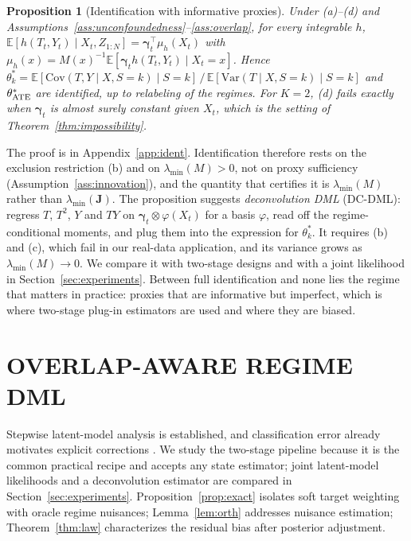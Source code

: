 \documentclass[twoside]{article}
\newtheorem{proposition}{Proposition}
\theoremstyle{definition}
\newcommand{\E}{\mathbb{E}}
\newcommand{\Var}{\mathrm{Var}}
\newcommand{\Cov}{\mathrm{Cov}}
\newcommand{\bJ}{\boldsymbol{J}}
\newcommand{\bgam}{\boldsymbol{\gamma}}
\newcommand{\lmin}{\lambda_{\min}}
\begin{document}
\begin{proposition}[Identification with informative proxies]
\label{prop:ident}
Under (a)--(d) and Assumptions~\ref{ass:unconfoundedness}--\ref{ass:overlap}, for every integrable $h$, $\E[h(T_t,Y_t)\mid X_t,Z_{1:N}]=\bgam_t^\top\mu_h(X_t)$ with $\mu_h(x)=M(x)^{-1}\E[\bgam_th(T_t,Y_t)\mid X_t{=}x]$. Hence $\theta_k^*=\E[\Cov(T,Y\mid X,S{=}k)\mid S{=}k]\,/\,\E[\Var(T\mid X,S{=}k)\mid S{=}k]$ and $\theta^*_{\rm ATE}$ are identified, up to relabeling of the regimes. For $K=2$, (d) fails exactly when $\bgam_t$ is almost surely constant given $X_t$, which is the setting of Theorem~\ref{thm:impossibility}.
\end{proposition}
The proof is in Appendix~\ref{app:ident}. Identification therefore rests on the exclusion restriction (b) and on $\lmin(M)>0$, not on proxy sufficiency (Assumption~\ref{ass:innovation}), and the quantity that certifies it is $\lmin(M)$ rather than $\lmin(\bJ)$. The proposition suggests \emph{deconvolution DML} (DC-DML): regress $T$, $T^2$, $Y$ and $TY$ on $\bgam_t\otimes\varphi(X_t)$ for a basis $\varphi$, read off the regime-conditional moments, and plug them into the expression for $\theta_k^*$. It requires (b) and (c), which fail in our real-data application, and its variance grows as $\lmin(M)\to0$. We compare it with two-stage designs and with a joint likelihood in Section~\ref{sec:experiments}. Between full identification and none lies the regime that matters in practice: proxies that are informative but imperfect, which is where two-stage plug-in estimators are used and where they are biased.

\section{OVERLAP-AWARE REGIME DML}
\label{sec:method}

Stepwise latent-model analysis is established, and classification error already motivates explicit corrections \citep{dimari2016bias}. We study the two-stage pipeline because it is the common practical recipe and accepts any state estimator; joint latent-model likelihoods and a deconvolution estimator are compared in Section~\ref{sec:experiments}. Proposition~\ref{prop:exact} isolates soft target weighting with oracle regime nuisances; Lemma~\ref{lem:orth} addresses nuisance estimation; Theorem~\ref{thm:law} characterizes the residual bias after posterior adjustment.
\end{document}
